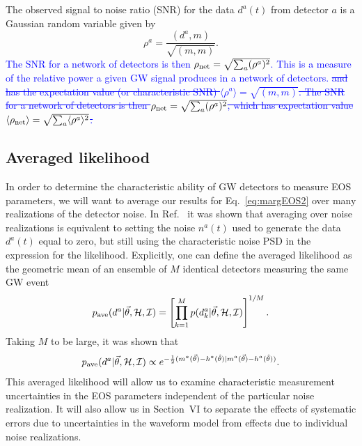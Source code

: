 \documentclass[twocolumn,prd,amssymb,aps,nofootinbib,showpacs,epsf]{revtex4}
\newcommand\les[2]{\textcolor{blue}{{#1}\sout{#2}}}
\begin{document}
The observed signal to noise ratio (SNR) for the data $d^a(t)$ from detector $a$ is a Gaussian random variable given by
\begin{equation}
\rho^a = \frac{(d^a, m)}{\sqrt{(m, m)}}.
\end{equation}
\les{The SNR for a network of detectors is then $\rho_{\rm net} = \sqrt{\sum_a(\rho^a)^2}$.  This is a measure of the relative power a given GW signal produces in a network of detectors.}{ and has the expectation value (or characteristic SNR) $\langle \rho^a \rangle = \sqrt{(m, m)}$. The SNR for a network of detectors is then $\rho_{\rm net} = \sqrt{\sum_a(\rho^a)^2}$, which has expectation value $\langle \rho_{\rm net} \rangle = \sqrt{\sum_a\langle \rho^a \rangle^2}$.}

\subsection{Averaged likelihood}
\label{sec:averagelike}

In order to determine the characteristic ability of GW detectors to measure EOS parameters, we will want to average our results for Eq.~\eqref{eq:margEOS2} over many realizations of the detector noise. In Ref.~\cite{NissankeHolzHughes2010} it was shown that averaging over noise realizations is equivalent to setting the noise $n^a(t)$ used to generate the data $d^a(t)$ equal to zero, but still using the characteristic noise PSD in the expression for the likelihood. Explicitly, one can define the averaged likelihood as the geometric mean of an ensemble of $M$ identical detectors measuring the same GW event
\begin{equation}
p_{\rm ave}(d^a | \vec\theta, \mathcal{H}, \mathcal{I}) = \left[\prod_{k=1}^M p(d_k^a | \vec\theta, \mathcal{H}, \mathcal{I})\right]^{1/M}.
\end{equation}
Taking $M$ to be large, it was shown that
\begin{equation}
\label{eq:averagedlike}
p_{\rm ave}(d^a | \vec\theta, \mathcal{H}, \mathcal{I}) \propto e^{-\frac{1}{2}(m^a(\vec\theta) - h^a(\hat\theta) | m^a(\vec\theta) - h^a(\hat\theta))}.
\end{equation}
This averaged likelihood will allow us to examine characteristic measurement uncertainties in the EOS parameters independent of the particular noise realization. It will also allow us in Section~VI to separate the effects of systematic errors due to uncertainties in the waveform model from effects due to individual noise realizations.
\end{document}
